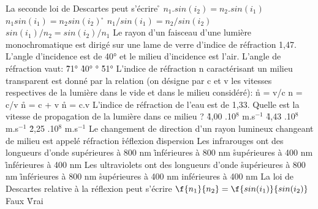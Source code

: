 %
\q
La seconde loi de Descartes peut s'écrire
\r
	     $n_1. sin(i_2) = n_2. sin(i_1)$
\rv
    $ n_1  sin(i_1) = n_2  sin(i_2)$
\r
	      $n_1/sin(i_1) = n_2/sin(i_2)$
\rv
	      $sin(i_1)/n_2 = sin(i_2)/n_1$
\q	      
	Le rayon d'un faisceau d'une lumière monochromatique est dirigé sur une lame de verre d'indice de réfraction 1,47. L'angle d'incidence est de 40° et le milieu d'incidence est l'air. L'angle de réfraction vaut:
\r
	      71°
\r
	      40°
°
\r
	      51°
\q
	L'indice de réfraction n caractérisant un milieu transparent est donné par la relation (on désigne par c et v les vitesses respectives de la lumière dans le vide et dans le milieu considéré):
\r
	      n = v/c
\rv
      n = c/v
\r
	      n = c + v
\r
	      n = c.v
\q
	L'indice de réfraction de l'eau est de 1,33. Quelle est la vitesse de propagation de la lumière dans ce milieu ?
\r
	      4,00 .10$^{8}$ m.s$^{-1}$
\r
	      4,43 .10$^{8}$ m.s$^{-1}$
\r
	      2,25 .10$^{8}$ m.s$^{-1}$
\q
Le changement de direction d'un rayon lumineux changeant de milieu est appelé
\rv
réfraction
\r
réflexion
\r
dispersion
\q
Les infrarouges ont des longueurs d'onde 
\rv
supérieures à 800 nm
\r
inférieures à 800 nm
\r
supérieures à 400 nm
\r
inférieures à 400 nm
\q
Les ultraviolets ont des longueurs d'onde 
\r
supérieures à 800 nm
\r
inférieures à 800 nm
\r
supérieures à 400 nm
\rv
inférieures à 400 nm
\q
La loi de Descartes relative à la réflexion peut s'écrire
$\f{n_1}{n_2}=\f{sin(i_1)}{sin(i_2)}$
\rv
Faux
\r
Vrai



